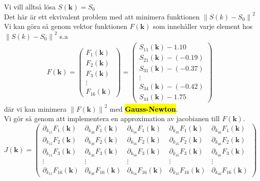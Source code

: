 \documentclass{assignment}
\begin{document}
Vi vill alltså lösa $S(\mathbf{k})=S_0$
\\ Det här är ett ekvivalent problem med att minimera funktionen $\left\| S(k)-S_0\right\|^2$
\\ Vi kan göra så genom vektor funktionen $F(\mathbf{k})$ som innehåller varje element hos $\left\| S(k)-S_0\right\|^2$ s.a
\begin{align}
    F(\mathbf{k}) = \begin{pmatrix} \label{F function}
        F_1(\mathbf{k})
        \\ F_2(\mathbf{k})
        \\ F_3(\mathbf{k})
        \\ \vdots
        \\ F_{16}(\mathbf{k})
    \end{pmatrix}
    =
    \begin{pmatrix}
        S_{11}(\mathbf{k})-1.10
        \\ S_{21}(\mathbf{k})-(-0.19)
        \\ S_{31}(\mathbf{k})-(-0.37)
        \\ \vdots
        \\ S_{34}(\mathbf{k})-(-0.42)
        \\ S_{44}(\mathbf{k})-1.75
    \end{pmatrix}
\end{align}
där vi kan minimera $\left\|F(\mathbf{k})\right\|^2$ med \hl{\textbf{Gauss-Newton}}.
\\ Vi gör så genom att implementera en approximation av jacobianen till $F(\mathbf{k})$.
\\$J(\mathbf{k})=
\begin{pmatrix}
    \partial_{k_{15}} F_1(\mathbf{k}) & \partial_{k_{26}} F_1(\mathbf{k}) & \partial_{k_{56}} F_1(\mathbf{k}) & \partial_{k_{35}} F_1(\mathbf{k}) & \partial_{k_{46}} F_1(\mathbf{k})
    \\ \partial_{k_{15}} F_2(\mathbf{k}) & \partial_{k_{26}} F_2(\mathbf{k}) & \partial_{k_{56}} F_2(\mathbf{k}) & \partial_{k_{35}} F_2(\mathbf{k}) & \partial_{k_{46}} F_2(\mathbf{k})
    \\ \partial_{k_{15}} F_3(\mathbf{k}) & \partial_{k_{26}} F_3(\mathbf{k}) & \partial_{k_{56}} F_3(\mathbf{k}) & \partial_{k_{35}} F_3(\mathbf{k}) & \partial_{k_{46}} F_3(\mathbf{k})
    \\ \vdots & \vdots & \vdots & \vdots & \vdots
    \\ \partial_{k_{15}} F_{16}(\mathbf{k}) & \partial_{k_{26}} F_{16}(\mathbf{k}) & \partial_{k_{56}} F_{16}(\mathbf{k}) & \partial_{k_{35}} F_{16}(\mathbf{k}) & \partial_{k_{46}} F_{16}(\mathbf{k})
\end{pmatrix}$
\end{document}
